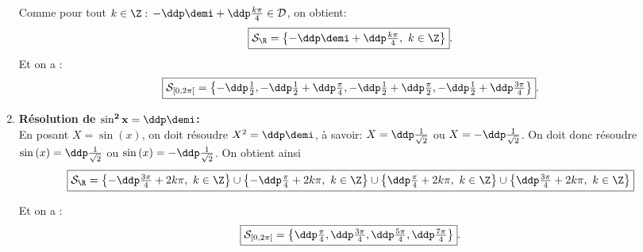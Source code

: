\begin{correction}
\begin{enumerate}
\begin{minipage}[c]{0.45\textwidth}
Comme pour tout $k\in\Z:$ $-\ddp\demi+\ddp\frac{k\pi}{4}\in\mathcal{D}$, on obtient:
$$\fbox{$\mathcal{S}_{\R}=\left\lbrace -\ddp\demi+\ddp\frac{k\pi}{4},\ k\in\Z\right\rbrace$}.$$
Et on a :
$$\fbox{$\mathcal{S}_{[0,2\pi[}=\left\{ - \ddp\frac{1}{2}, - \ddp\frac{1}{2}+\ddp\frac{\pi}{4},  - \ddp\frac{1}{2}+\ddp\frac{\pi}{2},  - \ddp\frac{1}{2}+\ddp\frac{3\pi}{4} \right\}$}.$$
\end{minipage}
\quad \begin{minipage}[c]{0.45\textwidth}
\begin{center}
\end{center}
\end{minipage}
\item \textbf{R\'esolution de $\mathbf{\sin^2{x}=\ddp\demi}$:}\\
\noindent  En posant $X=\sin{(x)}$, on doit r\'esoudre $X^2=\ddp\demi$, \`{a} savoir: $X=\ddp\frac{1}{\sqrt{2}}$ ou $X=-\ddp\frac{1}{\sqrt{2}}$. On doit donc r\'esoudre $\sin{(x)}=\ddp\frac{1}{\sqrt{2}}$ ou $\sin{(x)}=-\ddp\frac{1}{\sqrt{2}}$. On obtient ainsi
$$\fbox{$\mathcal{S}_{\R}=\left\lbrace  -\ddp\frac{3\pi}{4}+2k\pi,\ k\in\Z \right\rbrace \cup\left\lbrace  -\ddp\frac{\pi}{4}+2k\pi,\ k\in\Z \right\rbrace \cup\left\lbrace  \ddp\frac{\pi}{4}+2k\pi,\ k\in\Z \right\rbrace \cup\left\lbrace  \ddp\frac{3\pi}{4}+2k\pi,\ k\in\Z \right\rbrace$}$$
\begin{minipage}[c]{0.45\textwidth}
Et on a :
$$\fbox{$ \mathcal{S}_{\lbrack 0,2\pi\lbrack}=\left\lbrace \ddp\frac{\pi}{4},\ddp\frac{3\pi}{4},\ddp\frac{5\pi}{4},\ddp\frac{7\pi}{4}  \right\rbrace$}.$$
\end{minipage}
\quad \begin{minipage}[c]{0.45\textwidth}
\begin{center}

\end{center}
\end{minipage}
\end{enumerate}
\end{correction}
